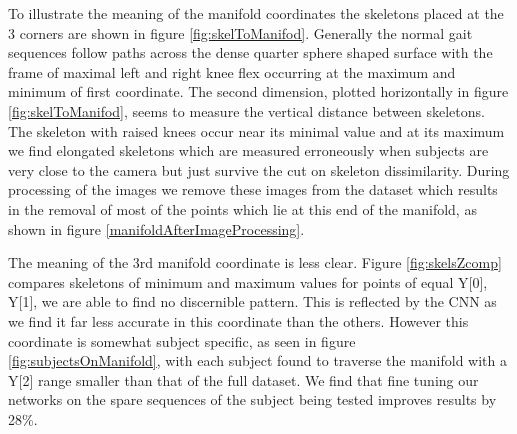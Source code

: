 \documentclass[11pt]{article} %
\begin{document}
To illustrate the meaning of the manifold coordinates the skeletons placed at the 3 corners are shown in figure \ref{fig:skelToManifod}. Generally the normal gait sequences follow paths across the dense quarter sphere shaped surface with the frame of maximal left and right knee flex occurring at the maximum and minimum of first coordinate. The second dimension, plotted horizontally in figure \ref{fig:skelToManifod}, seems to measure the vertical distance between skeletons. The skeleton with raised knees occur near its minimal value and at its maximum we find elongated skeletons which are measured erroneously when subjects are very close to the camera but just survive the cut on skeleton dissimilarity. During processing of the images we remove these images from the dataset which results in the removal of most of the points which lie at this end of the manifold, as shown in figure \ref{manifoldAfterImageProcessing}. 

The meaning of the 3rd manifold coordinate is less clear. Figure \ref{fig:skelsZcomp} compares skeletons of minimum and maximum values for points of equal Y[0], Y[1], we are able to find no discernible pattern. This is reflected by the CNN as we find it far less accurate in this coordinate than the others. However this coordinate is somewhat subject specific, as seen in figure \ref{fig:subjectsOnManifold}, with each subject found to traverse the manifold with a Y[2] range smaller than that of the full dataset. We find that fine tuning our networks on the spare sequences of the subject being tested improves results by 28\%. 



\end{document}
